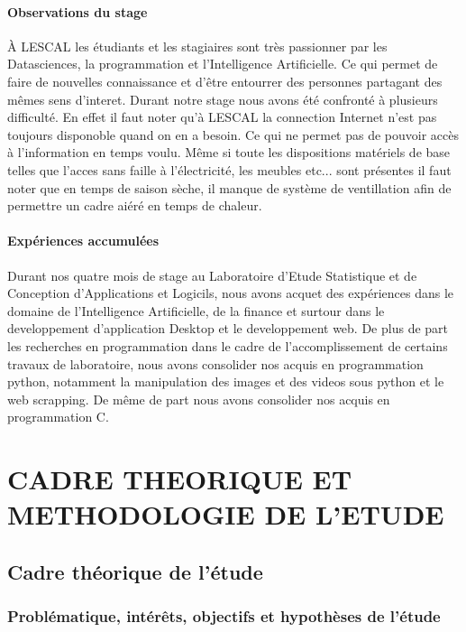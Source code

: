 \paragraph{Observations du stage}\label{observations-du-stage}

{À LESCAL les étudiants et les stagiaires sont très passionner par les
Datasciences, la programmation et l'Intelligence Artificielle. Ce qui
permet de faire de nouvelles connaissance et d'être entourrer des
personnes partagant des mêmes sens d'interet. Durant notre stage nous
avons été confronté à plusieurs difficulté. En effet il faut noter qu'à
LESCAL la connection Internet n'est pas toujours disponoble quand on en
a besoin. Ce qui ne permet pas de pouvoir accès à l'information en temps
voulu. Même si toute les dispositions matériels de base telles que
l'acces sans faille à l'électricité, les meubles etc... sont présentes
il faut noter que en temps de saison sèche, il manque de système de
ventillation afin de permettre un cadre aiéré en temps de chaleur. }

\paragraph{Expériences accumulées}\label{expuxe9riences-accumuluxe9es}

{Durant nos quatre mois de stage au Laboratoire d'Etude Statistique et
de Conception d'Applications et Logicils, nous avons acquet des
expériences dans le domaine de l'Intelligence Artificielle, de la
finance et surtour dans le developpement d'application Desktop et le
developpement web. De plus de part les recherches en programmation dans
le cadre de l'accomplissement de certains travaux de laboratoire, nous
avons consolider nos acquis en programmation python, notamment la
manipulation des images et des videos sous python et le web scrapping.
De même de part nous avons consolider nos acquis en programmation C.}

\section{CADRE THEORIQUE ET METHODOLOGIE DE
L'ETUDE}\label{cadre-theorique-et-methodologie-de-letude}

\subsection{Cadre théorique de
l'étude}\label{cadre-thuxe9orique-de-luxe9tude}

\subsubsection{Problématique, intérêts, objectifs et hypothèses de
l'étude}\label{probluxe9matique-intuxe9ruxeats-objectifs-et-hypothuxe8ses-de-luxe9tude}

